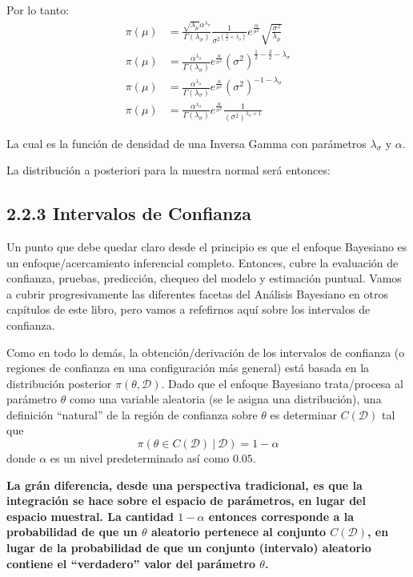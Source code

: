 \documentclass[12pt,]{article}
\begin{document}
Por lo tanto: \[
\begin{array}{rl}
\pi(\mu) & = \frac{\sqrt{\lambda_\mu}\alpha^{\lambda_\sigma}}{\Gamma(\lambda_\sigma)} \frac{1}{{\sigma^2}^{(\frac{3}{2}+\lambda_\sigma)}}e^{\frac{\alpha}{\sigma^2}} \sqrt{\frac{\sigma^2}{\lambda_\mu}}\\
\pi(\mu) & = \frac{\alpha^{\lambda_\sigma}}{\Gamma(\lambda_\sigma)}e^{\frac{\alpha}{\sigma^2}} (\sigma^2)^{\frac{1}{2}-\frac{3}{2}-\lambda_\sigma}\\
\pi(\mu) & = \frac{\alpha^{\lambda_\sigma}}{\Gamma(\lambda_\sigma)}e^{\frac{\alpha}{\sigma^2}} (\sigma^2)^{-1-\lambda_\sigma}\\
\pi(\mu) & = \frac{\alpha^{\lambda_\sigma}}{\Gamma(\lambda_\sigma)}e^{\frac{\alpha}{\sigma^2}}\frac{1}{(\sigma^2)^{\lambda_\sigma+1}}
\end{array}
\]

La cual es la función de densidad de una Inversa Gamma con parámetros
\(\lambda_\sigma\) y \(\alpha\).

La distribución a posteriori para la muestra normal será entonces:

\subsection{2.2.3 Intervalos de
Confianza}\label{intervalos-de-confianza}

Un punto que debe quedar claro desde el principio es que el enfoque
Bayesiano es un enfoque/acercamiento inferencial completo. Entonces,
cubre la evaluación de confianza, pruebas, predicción, chequeo del
modelo y estimación puntual. Vamos a cubrir progresivamente las
diferentes facetas del Análisis Bayesiano en otros capítulos de este
libro, pero vamos a refefirnos aquí sobre los intervalos de confianza.

Como en todo lo demás, la obtención/derivación de los intervalos de
confianza (o regiones de confianza en una configuración más general)
está basada en la distribución posterior \(\pi(\theta,\mathcal{D})\).
Dado que el enfoque Bayesiano trata/procesa al parámetro \(\theta\) como
una variable aleatoria (se le asigna una distribución), una definición
``natural'' de la región de confianza sobre \(\theta\) es determinar
\(C(\mathcal{D})\) tal que \[
\tag{2.9}
\pi(\theta \in C(\mathcal{D})\ |\ \mathcal{D}) = 1 - \alpha
\] donde \(\alpha\) es un nivel predeterminado así como \(0.05\).

\textbf{La grán diferencia, desde una perspectiva tradicional, es que la
integración se hace sobre el espacio de parámetros, en lugar del espacio
muestral. La cantidad \(1-\alpha\) entonces corresponde a la
probabilidad de que un \(\theta\) aleatorio pertenece al conjunto
\(C(\mathcal{D})\), en lugar de la probabilidad de que un conjunto
(intervalo) aleatorio contiene el ``verdadero'' valor del parámetro
\(\theta\).}
\end{document}
